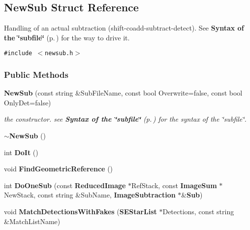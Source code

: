 \subsection{New\-Sub  Struct Reference}
\label{struct_newsub}
Handling of an actual subtraction (shift-coadd-subtract-detect). See {\bf Syntax of the \char`\"{}subfile\char`\"{}} {\rm (p.\,\pageref{subfile})} for the way to drive it. 


{\tt \#include $<$newsub.h$>$}

\subsubsection*{Public Methods}
\begin{CompactItemize}
\item 
{}
{\bf New\-Sub} (const string \&Sub\-File\-Name, const bool Overwrite=false, const bool Only\-Det=false)\label{struct_newsub_a0}

\begin{CompactList}\small\item\em the constructor. see {\bf Syntax of the \char`\"{}subfile\char`\"{}} {\rm (p.\,\pageref{subfile})} for the syntax of the \char`\"{}subfile\char`\"{}.\item\end{CompactList}\item 
{}
{\bf $\sim$New\-Sub} ()\label{struct_newsub_a1}

\item 
{}
int {\bf Do\-It} ()\label{struct_newsub_a2}

\item 
{}
void {\bf Find\-Geometric\-Reference} ()\label{struct_newsub_a3}

\item 
{}
int {\bf Do\-One\-Sub} (const {\bf Reduced\-Image} $\ast$Ref\-Stack, const {\bf Image\-Sum} $\ast$New\-Stack, const string \&Sub\-Name, {\bf Image\-Subtraction} $\ast$\&{\bf Sub})\label{struct_newsub_a4}

\item 
{}
void {\bf Match\-Detections\-With\-Fakes} ({\bf SEStar\-List} $\ast$Detections, const string \&Match\-List\-Name)\label{struct_newsub_a5}


\end{CompactItemize}
